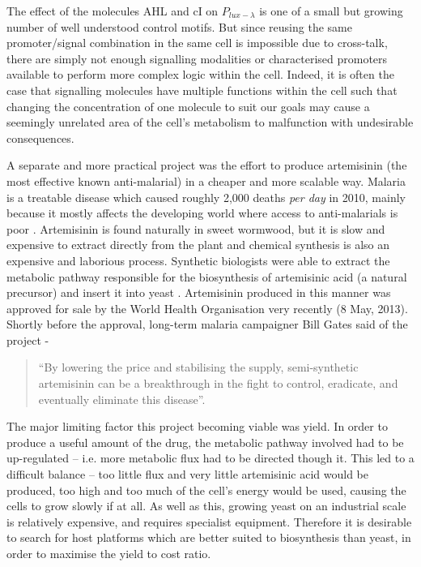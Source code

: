 The effect of the molecules AHL and cI on $P_{lux-\lambda}$ is one of a small
but growing number of well understood control motifs.
But since reusing the same promoter/signal combination in the same cell is 
impossible due to cross-talk, there are simply not enough signalling modalities 
or characterised promoters available to perform more complex logic within the 
cell.
Indeed, it is often the case that signalling molecules have multiple functions
within the cell such that changing the concentration of one molecule to suit
our goals may cause a seemingly unrelated area of the cell's metabolism to
malfunction with undesirable consequences.

A separate and more practical project was the effort to produce 
artemisinin (the most effective known anti-malarial) in a cheaper and more 
scalable way.
Malaria is a treatable disease which caused roughly 2,000 deaths 
\emph{per day} in 2010, mainly because it mostly affects the developing world 
where access to anti-malarials is poor \citep{malaria}.
Artemisinin is found naturally in sweet wormwood, but it is slow and expensive
to extract directly from the plant and chemical synthesis is also an expensive
and laborious process.
Synthetic biologists were able to extract the metabolic pathway responsible for
the biosynthesis of artemisinic acid (a natural precursor) and insert it into 
yeast \citep{yeast}.
Artemisinin produced in this manner was approved for sale by the World Health
Organisation very recently (8 May, 2013).
Shortly before the approval, long-term malaria campaigner Bill Gates said of 
the project -
\begin{quote}
  ``By lowering the price and stabilising the supply, semi-synthetic artemisinin
  can be a breakthrough in the fight to control, eradicate, and eventually
  eliminate this disease''.
\end{quote}

The major limiting factor this project becoming viable was yield.
In order to produce a useful amount of the drug, the metabolic pathway 
involved had to be up-regulated -- i.e. more metabolic flux had to be directed 
though it.
This led to a difficult balance -- too little flux and very little
artemisinic acid would be produced, too high and too much of the cell's
energy would be used, causing the cells to grow slowly if at all.
As well as this, growing yeast on an industrial scale is relatively expensive,
and requires specialist equipment.
Therefore it is desirable to search for host platforms which are better suited 
to biosynthesis than yeast, in order to maximise the yield to cost ratio.

